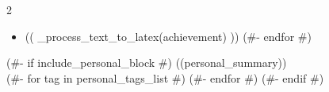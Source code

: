 \documentclass[10pt,a4paper,ragged2e,withhyper]{altacv}
\begin{document}
\begin{paracol}{2}
    \medskip


    \smallskip
    \begin{itemize}
        (#- for achievement in achievements_list #)
            \item (( _process_text_to_latex(achievement) ))
        (#- endfor #)
    \end{itemize}
    \medskip

    (#- if include_personal_block #)
    \smallskip
    ((personal_summary))\\
     (#- for tag in personal_tags_list #)  (#- endfor #)
    (#- endif #)


  \end{paracol}
\end{document}
